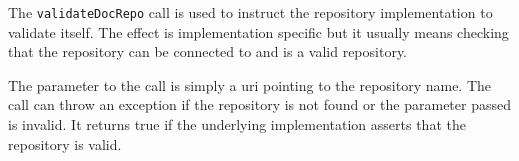 The \verb+validateDocRepo+ call is used to instruct the repository implementation to validate itself. The effect is
implementation specific but it usually means checking that the repository can be connected to and is a valid \Rapture
repository.

The parameter to the call is simply a uri pointing to the repository name. The call can throw an exception if the
repository is not found or the parameter passed is invalid. It returns true if the underlying implementation asserts
that the repository is valid.

